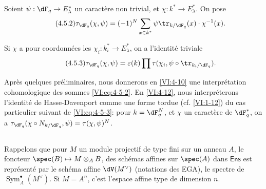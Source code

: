 Soient $\psi:\dF_q\to E_\lambda^\ast$ un caractère non trivial, et 
$\chi:k^\ast \to E_\lambda^\ast$. On pose 
\begin{equation*}\tag{4.5.2}\label{VI:eq:4-5-2}
  \tau_{\dF_q}(\chi,\psi) = (-1)^N \sum_{x\in k^\ast} \psi \tr_{k/\dF_q}(x) \cdot \chi^{-1}(x) \text{.} 
\end{equation*}

Si $\chi$ a pour coordonnées les $\chi_i:k_i^\ast \to E_\lambda^\ast$, on 
a l'identité triviale 
\begin{equation*}\tag{4.5.3}\label{VI:eq:4-5-3}
  \tau_{\dF_q}(\chi,\psi) = \varepsilon(k) \prod \tau(\chi_i,\psi\circ \tr_{k_i/\dF_q}) \text{.}
\end{equation*}

Après quelques préliminaires, nous donnerons en \ref{VI:4-10} une 
interprétation cohomologique des sommes \eqref{VI:eq:4-5-2}. En 
\ref{VI:4-12}, nous interpréterons l'identité de Hasse-Davenport comme une 
forme tordue (cf. \ref{VI:1-12}) du cas particulier suivant de 
\eqref{VI:eq:4-5-3}: pour $k=\dF_q^N$, et $\chi$ un caractère de 
$\dF_q^\ast$, on a 
$\tau_{\dF_q}(\chi\circ N_{k/\dF_q},\psi)=\tau(\chi,\psi)^N$. 





\subsection{}\label{VI:4-6}

Rappelons que pour $M$ un module projectif de type fini sur un anneau $A$, le 
foncteur $\spec(B)\mapsto M\otimes_A B$, des schémas affines sur $\spec(A)$ 
dans $\mathsf{Ens}$ est représenté par le schéma affine $\dV(M^\vee)$ 
(notations des EGA), le spectre de $\operatorname{Sym}_A^\bullet(M^\vee)$. Si 
$M=A^n$, c'est l'espace affine type de dimension $n$. 

